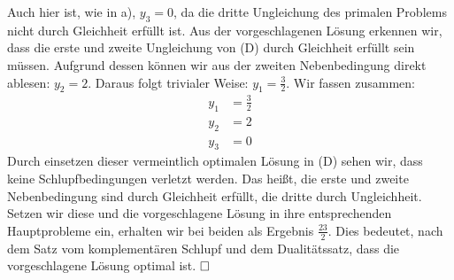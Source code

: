 \documentclass [a4paper,11pt]{article}
\begin{document}
\begin{enumerate}
\begin{enumerate}
                    Auch hier ist, wie in a), $y_3 = 0$, da die dritte Ungleichung des primalen Problems nicht durch Gleichheit erfüllt ist. Aus der
                    vorgeschlagenen Lösung erkennen wir, dass die erste und zweite Ungleichung von (D) durch Gleichheit erfüllt sein müssen.
                    Aufgrund dessen können wir aus der zweiten Nebenbedingung direkt ablesen: $y_2 = 2$. Daraus folgt trivialer Weise: $y_1 = \frac{3}{2}$.
                    Wir fassen zusammen:
                    \begin{align*}
                    y_1 &= \frac{3}{2}\\
                    y_2 &= 2\\
                    y_3 &= 0
                    \end{align*}
                    Durch einsetzen dieser vermeintlich optimalen Lösung in (D) sehen wir, dass keine Schlupfbedingungen verletzt werden. Das heißt, die
                    erste und zweite Nebenbedingung sind durch Gleichheit erfüllt, die dritte durch Ungleichheit. Setzen wir diese und die vorgeschlagene
                    Lösung in ihre entsprechenden Hauptprobleme ein, erhalten wir bei beiden als Ergebnis $\frac{23}{2}$. Dies bedeutet, nach dem Satz vom
                    komplementären Schlupf und dem Dualitätssatz, dass die vorgeschlagene Lösung optimal ist. $\qed$

            \end{enumerate}


\end{enumerate}
\end{document}
